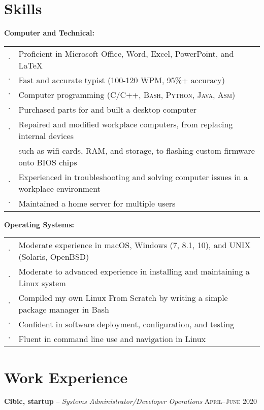 \documentclass[letterpaper,12pt]{article}
\begin{document}
\section{Skills}

\textbf{Computer and Technical:}

\begin{tabular}{rl}
$\cdot$ & Proficient in Microsoft Office, Word, Excel, PowerPoint, and \LaTeX \\
$\cdot$ & Fast and accurate typist (100-120 WPM, 95\%+ accuracy) \\
$\cdot$ & Computer programming (\textsc{C/C++, Bash, Python, Java, Asm}) \\
$\cdot$ & Purchased parts for and built a desktop computer \\
$\cdot$ & Repaired and modified workplace computers, from replacing internal devices \\
        & such as wifi cards, RAM, and storage, to flashing custom firmware onto BIOS chips \\
$\cdot$ & Experienced in troubleshooting and solving computer issues in a workplace environment \\
$\cdot$ & Maintained a home server for multiple users \\
\end{tabular}

\textbf{Operating Systems:}

\begin{tabular}{rl}
$\cdot$ & Moderate experience in macOS, Windows (7, 8.1, 10), and UNIX (Solaris, OpenBSD) \\
$\cdot$ & Moderate to advanced experience in installing and maintaining a Linux system \\
$\cdot$ & Compiled my own Linux From Scratch by writing a simple package manager in Bash \\
$\cdot$ & Confident in software deployment, configuration, and testing \\
$\cdot$ & Fluent in command line use and navigation in Linux \\
\end{tabular}

\section{Work Experience}

\textbf{Cibic, startup} -- \textit{Systems Administrator/Developer Operations} \hfill \textsc{April--June 2020}
\end{document}
